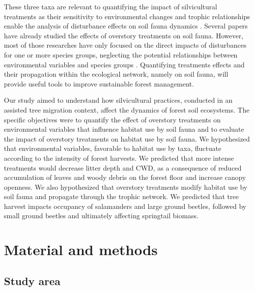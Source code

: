 
These three taxa are relevant to quantifying the impact of silvicultural treatments as their sensitivity to environmental changes and trophic relationships enable the analysis of disturbance effects on soil fauna dynamics \citep{Salmon2008Relationshipssoil}.
Several papers have already studied the effects of overstory treatments on soil fauna.
However, most of those researches have only focused on the direct impacts of disturbances for one or more species groups, neglecting the potential relationships between environmental variables and species groups \citep{josephIntegratingOccupancyModels2016,Pollierer2021Diversityfunctional,Kudrin2023metaanalysiseffects}. 
Quantifying treatments effects and their propagation within the ecological network, namely on soil fauna, will provide useful tools to improve sustainable forest management.

Our study aimed to understand how silvicultural practices, conducted in an assisted tree migration context, affect the dynamics of forest soil ecosystems. 
The specific objectives were to quantify the effect of overstory treatments on environmental variables that influence habitat use by soil fauna
and to evaluate the impact of overstory treatments on habitat use by soil fauna.
We hypothesized that environmental variables, favorable to habitat use by taxa, fluctuate according to the intensity of forest harvests. 
We predicted that more intense treatments would decrease litter depth and CWD, as a consequence of reduced accumulation of leaves and woody debris on the forest floor and increase canopy openness. 
We also hypothesized that overstory treatments modify habitat use by soil fauna and propagate through the trophic network. 
We predicted that tree harvest impacts occupancy of salamanders and large ground beetles, 
followed by small ground beetles and ultimately affecting springtail biomass. 


\section*{Material and methods}
\label{sec:matmet1}

\subsection*{Study area}
\label{subsec:area}

